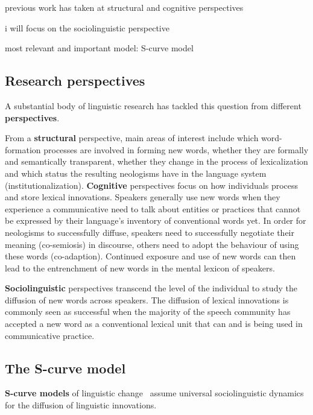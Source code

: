 \documentclass[draft, a4paper, abstract=on]{scrartcl}
\renewcommand{\hw}[1]{\textbf{#1}}
\begin{document}
previous work has taken at
structural and
cognitive perspectives

i will focus on the sociolinguistic perspective

most relevant and important model: S-curve model



  \subsection{Research perspectives}

A substantial body of linguistic research has tackled this question from different \hw{perspectives}. \parencite[16]{Schmid2016EnglishMorphology}

From a \hw{structural} perspective, main areas of interest include which word-formation processes are involved in forming new words, whether they are formally and semantically transparent, whether they change in the process of lexicalization and which status the resulting neologisms have in the language system (institutionalization). \parencite[e.g.][]{Bauer1983EnglishWordformation, Lipka2005LexicalizationInstitutionalization}
\hw{Cognitive} perspectives focus on how individuals process and store lexical innovations. Speakers generally use new words when they experience a communicative need to talk about entities or practices that cannot be expressed by their language's inventory of conventional words yet. In order for neologisms to successfully diffuse, speakers need to successfully negotiate their meaning (co-semiosis) in discourse, others need to adopt the behaviour of using these words (co-adaption). Continued exposure and use of new words can then lead to the entrenchment of new words in the mental lexicon of speakers.~\parencite{Schmid2008NewWords}

\hw{Sociolinguistic} perspectives transcend the level of the individual to study the diffusion of new words across speakers. The diffusion of lexical innovations is commonly seen as successful when the majority of the speech community has accepted a new word as a conventional lexical unit that can and is being used in communicative practice.

  \subsection{The S-curve model}

\hw{S-curve models} of linguistic change~\parencite{Milroy1992LinguisticVariation, Nevalainen2015DescriptiveAdequacy, Labov2007TransmissionDiffusion} assume universal sociolinguistic dynamics for the diffusion of linguistic innovations.
\end{document}
